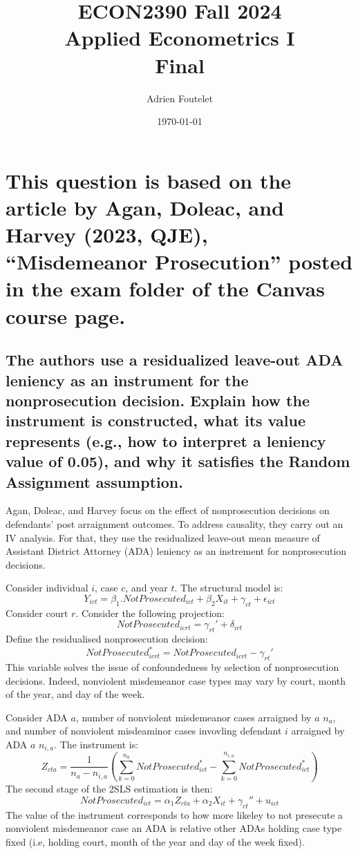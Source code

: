 \documentclass{article}
\title{ECON2390 Fall 2024\\Applied Econometrics I\\Final}
\author{Adrien Foutelet}
\date{\today}
\begin{document}
\maketitle

\section{This question is based on the article by Agan, Doleac, and Harvey (2023, QJE), “Misdemeanor Prosecution” \cite{agan2023} posted in the exam folder of the Canvas course page.}

\subsection{The authors use a residualized leave-out ADA leniency as an instrument for the nonprosecution decision. Explain how the instrument is constructed, what its value represents (e.g., how to interpret a leniency value of 0.05), and why it satisfies the Random Assignment assumption.}

Agan, Doleac, and Harvey focus on the effect of nonprosecution decisions on defendants' post arraignment outcomes. To address causality, they carry out an IV analysis. For that, they use the residualized leave-out mean measure of Assistant District Attorney (ADA) leniency as an instrement for nonprosecution decisions.

Consider individual \(i\), case \(c\), and year \(t\). The structural model is:
\[Y_{ict}=\beta_1.\textit{NotProsecuted}_{ict}+\beta_2 X_{it}+\gamma_{ct}+\epsilon_{ict}\]
Consider court \(r\).
Consider the following projection:
\[\textit{NotProsecuted}_{icrt}=\gamma_{rt}'+\delta_{irt}\]
Define the residualised nonprosecution decision:
\[\textit{NotProsecuted}_{icrt}^{*}=\textit{NotProsecuted}_{icrt}-\gamma_{rt}'\]
This variable solves the issue of confoundedness by selection of nonprosecution decisions. Indeed, nonviolent misdemeanor case types may vary by court, month of the year, and day of the week.

Consider ADA \(a\), number of nonviolent misdemeanor cases arraigned by \(a\) \(n_{a}\), and number of nonviolent misdeaminor cases invovling defendant \(i\) arraigned by ADA \(a\) \(n_{i,a}\). The instrument is:
\[
Z_{cta}= \frac{1}{n_{a}-n_{i,a}}
\left(
    \sum_{k=0}^{n_a}  \textit{NotProsecuted}_{ict}^{*}
    - \sum_{k=0}^{n_{i,a}}  \textit{NotProsecuted}_{ict}^{*}
\right)
\]
The second stage of the 2SLS estimation is then:
\[\textit{NotProsecuted}_{ict}=\alpha_1 Z_{cta}+\alpha_2 X_{it}+\gamma_{ct}''+u_{ict}\]
The value of the instrument corresponds to how more likeley to not presecute a nonviolent misdemeanor case an ADA is relative other ADAs holding case type fixed (i.e, holding court, month of the year and day of the week fixed).
\end{document}
